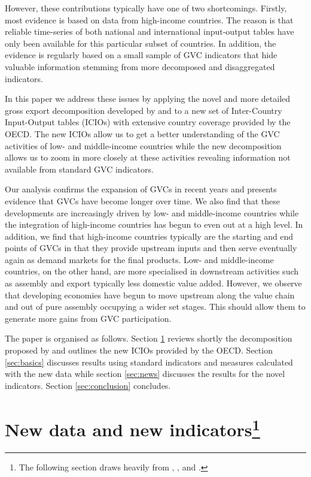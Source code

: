 \documentclass[11pt,a4paper]{article}
\begin{document}
However, these contributions typically have one of two shortcomings. Firstly, most evidence is based on data from high-income countries. The reason is that reliable time-series of both national and international input-output tables have only been available for this particular subset of countries. In addition, the evidence is regularly based on a small sample of GVC indicators that hide valuable information stemming from more decomposed and disaggregated indicators. 

In this paper we address these issues by applying the novel and more detailed gross export decomposition developed by \citet{zhwaetal13} and \citet{rokoetal14} to a new set of Inter-Country Input-Output tables (ICIOs) with extensive country coverage provided by the OECD. The new ICIOs allow us to get a better understanding of the GVC activities of low- and middle-income countries while the new decomposition allows us to zoom in more closely at these activities revealing information not available from standard GVC indicators.

Our analysis confirms the expansion of GVCs in recent years and presents evidence that GVCs have become longer over time. We also find that these developments are increasingly driven by low- and middle-income countries while the integration of high-income countries has begun to even out at a high level. In addition, we find that high-income countries typically are the starting and end points of GVCs in that they provide upstream inputs and then serve eventually again as demand markets for the final products. Low- and middle-income countries, on the other hand, are more specialised in downstream activities such as assembly and export typically less domestic value added. However, we observe that developing economies have begun to move upstream along the value chain and out of pure assembly occupying a wider set stages. This should allow them to generate more gains from GVC participation.

The paper is organised as follows. Section \ref{sec:data} reviews shortly the decomposition proposed by \citet[WWZ henceforth]{zhwaetal13} and outlines the new ICIOs provided by the OECD. Section \ref{sec:basics} discusses results using standard indicators and measures calculated with the new data while section \ref{sec:news} discusses the results for the novel indicators. Section \ref{sec:conclusion} concludes.



\section[New data and new indicators]{New data and new indicators\footnote{The following section draws heavily from \citet{zhwaetal13}, \citet{viku16}, and \cite{baquviku15}.}}\label{sec:data}
\end{document}
